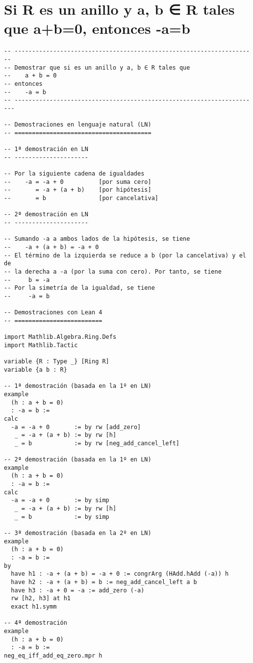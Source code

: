 \section{Si R es un anillo y a, b ∈ R tales que a+b=0, entonces -a=b}
\label{sec:orgb777e47}
\begin{verbatim}
-- ---------------------------------------------------------------------
-- Demostrar que si es un anillo y a, b ∈ R tales que
--    a + b = 0
-- entonces
--    -a = b
-- ----------------------------------------------------------------------

-- Demostraciones en lenguaje natural (LN)
-- =======================================

-- 1ª demostración en LN
-- ---------------------

-- Por la siguiente cadena de igualdades
--    -a = -a + 0          [por suma cero]
--       = -a + (a + b)    [por hipótesis]
--       = b               [por cancelativa]

-- 2ª demostración en LN
-- ---------------------

-- Sumando -a a ambos lados de la hipótesis, se tiene
--    -a + (a + b) = -a + 0
-- El término de la izquierda se reduce a b (por la cancelativa) y el de
-- la derecha a -a (por la suma con cero). Por tanto, se tiene
--     b = -a
-- Por la simetría de la igualdad, se tiene
--     -a = b

-- Demostraciones con Lean 4
-- =========================

import Mathlib.Algebra.Ring.Defs
import Mathlib.Tactic

variable {R : Type _} [Ring R]
variable {a b : R}

-- 1ª demostración (basada en la 1º en LN)
example
  (h : a + b = 0)
  : -a = b :=
calc
  -a = -a + 0       := by rw [add_zero]
   _ = -a + (a + b) := by rw [h]
   _ = b            := by rw [neg_add_cancel_left]

-- 2ª demostración (basada en la 1º en LN)
example
  (h : a + b = 0)
  : -a = b :=
calc
  -a = -a + 0       := by simp
   _ = -a + (a + b) := by rw [h]
   _ = b            := by simp

-- 3ª demostración (basada en la 2º en LN)
example
  (h : a + b = 0)
  : -a = b :=
by
  have h1 : -a + (a + b) = -a + 0 := congrArg (HAdd.hAdd (-a)) h
  have h2 : -a + (a + b) = b := neg_add_cancel_left a b
  have h3 : -a + 0 = -a := add_zero (-a)
  rw [h2, h3] at h1
  exact h1.symm

-- 4ª demostración
example
  (h : a + b = 0)
  : -a = b :=
neg_eq_iff_add_eq_zero.mpr h
\end{verbatim}

